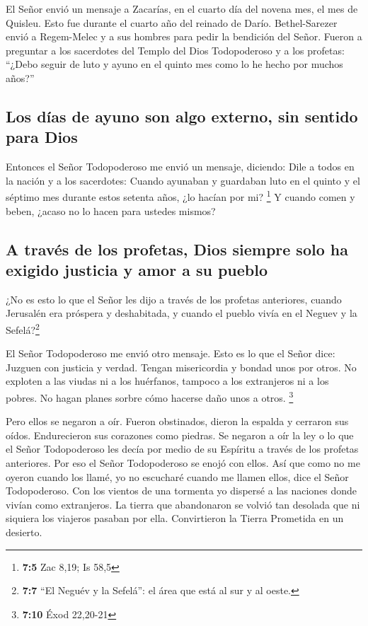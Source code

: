  El Señor envió un mensaje a Zacarías, en el cuarto día
del novena mes, el mes de Quisleu. Esto fue durante el cuarto año del
reinado de Darío.  Bethel-Sarezer envió a Regem-Melec y a
sus hombres para pedir la bendición del Señor.  Fueron a
preguntar a los sacerdotes del Templo del Dios Todopoderoso y a los
profetas: ``¿Debo seguir de luto y ayuno en el quinto mes como lo he
hecho por muchos años?''

\hypertarget{los-duxedas-de-ayuno-son-algo-externo-sin-sentido-para-dios}{%
\subsection{Los días de ayuno son algo externo, sin sentido para
Dios}\label{los-duxedas-de-ayuno-son-algo-externo-sin-sentido-para-dios}}

 Entonces el Señor Todopoderoso me envió un mensaje,
diciendo:  Dile a todos en la nación y a los sacerdotes:
Cuando ayunaban y guardaban luto en el quinto y el séptimo mes durante
estos setenta años, ¿lo hacían por mi? \footnote{\textbf{7:5} Zac 8,19;
  Is 58,5}  Y cuando comen y beben, ¿acaso no lo hacen
para ustedes mismos?

\hypertarget{a-travuxe9s-de-los-profetas-dios-siempre-solo-ha-exigido-justicia-y-amor-a-su-pueblo}{%
\subsection{A través de los profetas, Dios siempre solo ha exigido
justicia y amor a su
pueblo}\label{a-travuxe9s-de-los-profetas-dios-siempre-solo-ha-exigido-justicia-y-amor-a-su-pueblo}}

 ¿No es esto lo que el Señor les dijo a través de los
profetas anteriores, cuando Jerusalén era próspera y deshabitada, y
cuando el pueblo vivía en el Neguev y la Sefelá?\footnote{\textbf{7:7}
  ``El Neguév y la Sefelá'': el área que está al sur y al oeste.}

 El Señor Todopoderoso me envió otro mensaje.
 Esto es lo que el Señor dice: Juzguen con justicia y
verdad. Tengan misericordia y bondad unos por otros.  No
exploten a las viudas ni a los huérfanos, tampoco a los extranjeros ni a
los pobres. No hagan planes sorbre cómo hacerse daño unos a otros.
\footnote{\textbf{7:10} Éxod 22,20-21}

 Pero ellos se negaron a oír. Fueron obstinados, dieron
la espalda y cerraron sus oídos.  Endurecieron sus
corazones como piedras. Se negaron a oír la ley o lo que el Señor
Todopoderoso les decía por medio de su Espíritu a través de los profetas
anteriores. Por eso el Señor Todopoderoso se enojó con ellos.
 Así que como no me oyeron cuando los llamé, yo no
escucharé cuando me llamen ellos, dice el Señor Todopoderoso.
 Con los vientos de una tormenta yo dispersé a las
naciones donde vivían como extranjeros. La tierra que abandonaron se
volvió tan desolada que ni siquiera los viajeros pasaban por ella.
Convirtieron la Tierra Prometida en un desierto.


